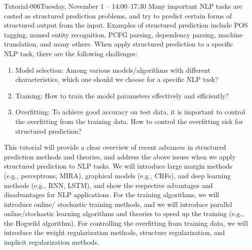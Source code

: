 \begin{tutorial}{Tutorial-006}{Tuesday, November 1 -- 14:00--17:30} {\TutLocF}
 Many important NLP tasks are casted as structured prediction problems, and try to predict certain forms of structured output from the input. Examples of structured prediction include POS tagging, named entity recognition, PCFG parsing, dependency parsing, machine translation, and many others. When apply structured prediction to a specific NLP task, there are the following challenges:
\begin{enumerate}
\item  Model selection: Among various models/algorithms with different characteristics, which one should we choose for a specific NLP task?
\item    Training: How to train the model parameters effectively and efficiently?
\item    Overfitting: To achieve good accuracy on test data, it is important to control the overfitting from the training data. How to control the overfitting risk for structured prediction?
\end{enumerate}
This tutorial will provide a clear overview of recent advances in structured prediction methods and theories, and address the above issues when we apply structured prediction to NLP tasks. We will introduce large margin methods (e.g., perceptrons, MIRA), graphical models (e.g., CRFs), and deep learning methods (e.g., RNN, LSTM), and show the respective advantages and disadvantages for NLP applications. For the training algorithms, we will introduce online/ stochastic training methods, and we will introduce parallel online/stochastic learning algorithms and theories to speed up the training (e.g., the Hogwild algorithm). For controlling the overfitting from training data, we will introduce the weight regularization methods, structure regularization, and implicit regularization methods. 
\end{tutorial} 

\clearpage{}






%
%
%





